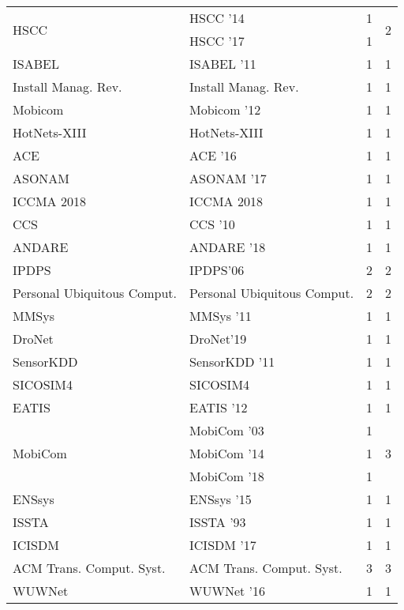 \begin{table*}[t]
\begin{tabular}{llrr}
\multirow{2}{*}{HSCC } & HSCC '14 & 1 & \multirow{2}{*}{2}\\
& HSCC '17 & 1 &\\
\multirow{1}{*}{ISABEL } & ISABEL '11 & 1 & \multirow{1}{*}{1}\\
\multirow{1}{*}{Install Manag. Rev.} & Install Manag. Rev. & 1 & \multirow{1}{*}{1}\\
\multirow{1}{*}{Mobicom } & Mobicom '12 & 1 & \multirow{1}{*}{1}\\
\multirow{1}{*}{HotNets-XIII} & HotNets-XIII & 1 & \multirow{1}{*}{1}\\
\multirow{1}{*}{ACE } & ACE '16 & 1 & \multirow{1}{*}{1}\\
\multirow{1}{*}{ASONAM } & ASONAM '17 & 1 & \multirow{1}{*}{1}\\
\multirow{1}{*}{ICCMA 2018} & ICCMA 2018 & 1 & \multirow{1}{*}{1}\\
\multirow{1}{*}{CCS } & CCS '10 & 1 & \multirow{1}{*}{1}\\
\multirow{1}{*}{ANDARE } & ANDARE '18 & 1 & \multirow{1}{*}{1}\\
\multirow{1}{*}{IPDPS} & IPDPS'06 & 2 & \multirow{1}{*}{2}\\
\multirow{1}{*}{Personal Ubiquitous Comput.} & Personal Ubiquitous Comput. & 2 & \multirow{1}{*}{2}\\
\multirow{1}{*}{MMSys } & MMSys '11 & 1 & \multirow{1}{*}{1}\\
\multirow{1}{*}{DroNet} & DroNet'19 & 1 & \multirow{1}{*}{1}\\
\multirow{1}{*}{SensorKDD } & SensorKDD '11 & 1 & \multirow{1}{*}{1}\\
\multirow{1}{*}{SICOSIM4} & SICOSIM4 & 1 & \multirow{1}{*}{1}\\
\multirow{1}{*}{EATIS } & EATIS '12 & 1 & \multirow{1}{*}{1}\\
\multirow{3}{*}{MobiCom } & MobiCom '03 & 1 & \multirow{3}{*}{3}\\
& MobiCom '14 & 1 &\\
& MobiCom '18 & 1 &\\
\multirow{1}{*}{ENSsys } & ENSsys '15 & 1 & \multirow{1}{*}{1}\\
\multirow{1}{*}{ISSTA } & ISSTA '93 & 1 & \multirow{1}{*}{1}\\
\multirow{1}{*}{ICISDM } & ICISDM '17 & 1 & \multirow{1}{*}{1}\\
\multirow{1}{*}{ACM Trans. Comput. Syst.} & ACM Trans. Comput. Syst. & 3 & \multirow{1}{*}{3}\\
\multirow{1}{*}{WUWNet } & WUWNet '16 & 1 & \multirow{1}{*}{1}\\

\end{tabular}
\end{table*}
